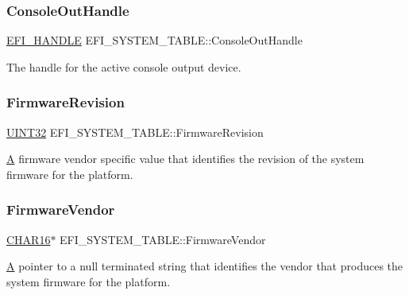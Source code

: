 \subsubsection{\texorpdfstring{Console\+Out\+Handle}{ConsoleOutHandle}}
{\footnotesize\ttfamily \hyperlink{_uefi_base_type_8h_af943d518ce8a229e7e51ce3fed0e3122}{E\+F\+I\+\_\+\+H\+A\+N\+D\+LE} E\+F\+I\+\_\+\+S\+Y\+S\+T\+E\+M\+\_\+\+T\+A\+B\+L\+E\+::\+Console\+Out\+Handle}

The handle for the active console output device. \mbox{\label{struct_e_f_i___s_y_s_t_e_m___t_a_b_l_e_a289adadc89c3c1efe7ec2e0eb8648d49}} 
\subsubsection{\texorpdfstring{Firmware\+Revision}{FirmwareRevision}}
{\footnotesize\ttfamily \hyperlink{_processor_bind_8h_ae1e6edbbc26d6fbc71a90190d0266018}{U\+I\+N\+T32} E\+F\+I\+\_\+\+S\+Y\+S\+T\+E\+M\+\_\+\+T\+A\+B\+L\+E\+::\+Firmware\+Revision}

\hyperlink{struct_a}{A} firmware vendor specific value that identifies the revision of the system firmware for the platform. \mbox{\label{struct_e_f_i___s_y_s_t_e_m___t_a_b_l_e_ac854bfc3d76bf13ee5f4701b069b5483}} 
\subsubsection{\texorpdfstring{Firmware\+Vendor}{FirmwareVendor}}
{\footnotesize\ttfamily \hyperlink{_processor_bind_8h_a7ae886893bd2a2ae253eb2b021a48724}{C\+H\+A\+R16}$\ast$ E\+F\+I\+\_\+\+S\+Y\+S\+T\+E\+M\+\_\+\+T\+A\+B\+L\+E\+::\+Firmware\+Vendor}

\hyperlink{struct_a}{A} pointer to a null terminated string that identifies the vendor that produces the system firmware for the platform. \mbox{\label{struct_e_f_i___s_y_s_t_e_m___t_a_b_l_e_adb950787e9f5999127d36f53ea23649e}} 

